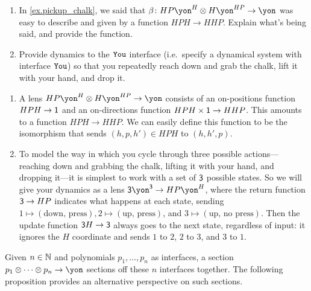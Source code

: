 \documentclass[Book-Poly]{subfiles}
\begin{document}
\begin{exercise}\label{exc.pickup_chalk}
\begin{enumerate}
	\item In \cref{ex.pickup_chalk}, we said that $\beta\colon HP\yon^H\otimes H\yon^{HP}\to\yon$ was easy to describe and given by a function $HPH\to HHP$. Explain what's being said, and provide the function.
	\item Provide dynamics to the $\texttt{You}$ interface (i.e.\ specify a dynamical system with interface $\texttt{You}$) so that you repeatedly reach down and grab the chalk, lift it with your hand, and drop it.
\qedhere
\end{enumerate}
\begin{solution}
\begin{enumerate}
    \item A lens $HP\yon^H \otimes H\yon^{HP} \to \yon$ consists of an on-positions function $HPH \to \textsf{1}$ and an on-directions function $HPH \times \textsf{1} \to HHP$.
    This amounts to a function $HPH \to HHP$.
    We can easily define this function to be the isomorphism that sends $(h,p,h') \in HPH$ to $(h,h',p)$.
    \item To model the way in which you cycle through three possible actions---reaching down and grabbing the chalk, lifting it with your hand, and dropping it---it is simplest to work with a set of $\textsf{3}$ possible states.
    So we will give your dynamics as a lens $\3\yon^\3 \to HP\yon^H$, where the return function $\textsf{3} \to HP$ indicates what happens at each state, sending $1 \mapsto (\text{down, press}), 2 \mapsto (\text{up, press})$, and $3 \mapsto (\text{up, no press})$.
    Then the update function $\textsf{3}H \to \textsf{3}$ always goes to the next state, regardless of input: it ignores the $H$ coordinate and sends $1$ to $2$, $2$ to $3$, and $3$ to $1$.
\end{enumerate}
\end{solution}
\end{exercise}


Given $n\in\mathbb{N}$ and polynomials $p_1,\ldots,p_n$ as interfaces, a section $p_1\otimes\cdots\otimes p_n\to\yon$ sections off these $n$ interfaces together.
The following proposition provides an alternative perspective on such sections.
\end{document}
